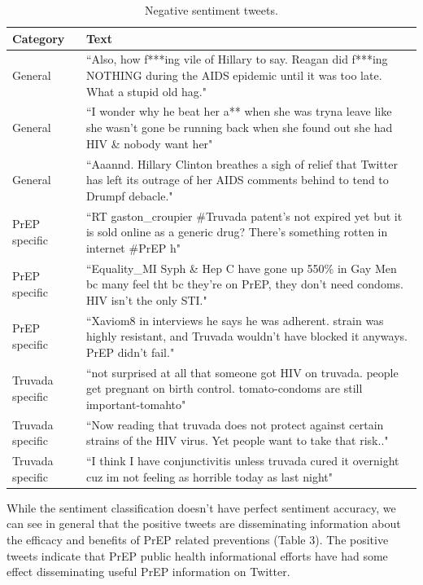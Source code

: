 \documentclass{sig-alternate-05-2015}
\begin{document}
\begin{table}
\centering
\caption{Negative sentiment tweets.}
\begin{tabular}{|p{2.5cm}|p{12cm}|} \hline
Category & Text\\ \hline
General & ``Also, how f***ing vile of Hillary to say. Reagan did f***ing NOTHING during the AIDS epidemic until it was too late. What a stupid old hag."\\ \hline
General & ``I wonder why he beat her a** when she was tryna leave like she wasn't gone be running back when she found out she had HIV \& nobody want her"\\ \hline
General & ``Aaannd. Hillary Clinton breathes a sigh of relief that Twitter has left its outrage of her AIDS comments behind to tend to Drumpf debacle."\\ \hline

PrEP specific & ``RT gaston\_croupier \#Truvada patent's not expired yet but it is sold online as a generic drug? There's something rotten in internet \#PrEP h"\\ \hline
PrEP specific & ``Equality\_MI Syph \& Hep C have gone up 550\% in Gay Men bc many feel tht bc they're on PrEP, they don't need condoms. HIV isn't the only STI."\\ \hline
PrEP specific & ``Xaviom8 in interviews he says he was adherent. strain was highly resistant, and Truvada wouldn't have blocked it anyways. PrEP didn't fail."\\ \hline

Truvada specific & ``not surprised at all that someone got HIV on truvada. people get pregnant on birth control. tomato-condoms are still important-tomahto"\\ \hline
Truvada specific & ``Now reading that truvada does not protect against certain strains of the HIV virus. Yet people want to take that risk.."\\ \hline
Truvada specific & ``I think I have conjunctivitis unless truvada cured it overnight cuz im not feeling as horrible today as last night"\\ \hline

\hline\end{tabular}
\end{table}

While the sentiment classification doesn't have perfect sentiment accuracy, we can see in general that the positive tweets are disseminating information about the efficacy and benefits of PrEP related preventions (Table 3). The positive tweets indicate that PrEP public health informational efforts have had some effect disseminating useful PrEP information on Twitter. 
\end{document}
